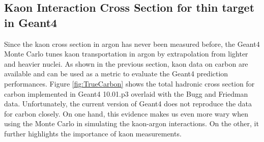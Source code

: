 




 \subsection{Kaon Interaction Cross Section for thin target in Geant4}
Since the kaon cross section in argon has never been measured before, the Geant4 Monte Carlo tunes kaon transportation in argon by extrapolation from lighter and heavier nuclei. As shown in the previous section,  kaon data on carbon are available and  can be used as a metric to evaluate the Geant4 prediction performances.  Figure \ref{fig:TrueCarbon} shows the total hadronic cross section for carbon implemented in Geant4 10.01.p3 overlaid with the Bugg and Friedman data. Unfortunately, the current version of Geant4 does not reproduce the data for carbon closely. On one hand, this evidence makes us even more wary when using the Monte Carlo in simulating the kaon-argon interactions. On the other, it further highlights the importance of kaon measurements.

